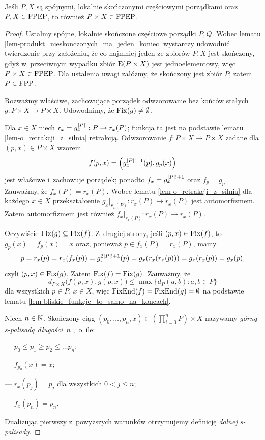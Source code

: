 \begin{stw}\label{stw-produkt_fpep_ma_fpep}
Jeśli $P,X$ są spójnymi, lokalnie skończonymi częściowymi porządkami oraz $P,X\in\mathrm{FPEP}$, to również $P\times X\in\mathrm{FPEP}$.
\end{stw}
\begin{proof}
Ustalmy spójne, lokalnie skończone częściowe porządki $P,Q$.
Wobec lematu \ref{lem-produkt_nieskonczonych_ma_jeden_koniec} wystarczy udowodnić twierdzenie przy założeniu, że co najmniej jeden ze zbiorów $P,X$ jest skończony, gdyż w~przeciwnym wypadku zbiór $\mathrm{E}(P\times X)$ jest jednoelementowy, więc $P\times X\in \mathrm{FPEP}$. Dla ustalenia uwagi załóżmy, że skończony jest zbiór $P$; zatem $P\in\mathrm{FPP}$.

Rozważmy właściwe, zachowujące porządek odwzorowanie bez końców stałych \mbox{$g\colon P\times X\to P\times X$}. Udowodnimy, że $\operatorname{Fix}(g)\not=\emptyset$. 

Dla $x\in X$ niech $r_x=g_x^{\left|P\right|!}\colon P\to r_x(P)$; funkcja ta jest na podstawie lematu \ref{lem-o_retrakcji_z_silnia} retrakcją. Odwzorowanie $f\colon P\times X\to P\times X$ zadane dla $(p,x)\in P\times X$ wzorem \[f(p,x)=\left(g_x^{\left|P\right|!+1}(p),g_p(x)\right)\] jest właściwe i~zachowuje porządek; ponadto $f_x=g_x^{\left|P\right|!+1}$ oraz $f_p=g_p$. Zauważmy, że $f_x(P)=r_x(P)$. Wobec lematu \ref{lem-o_retrakcji_z_silnia} dla każdego $x\in X$ przekształcenie $g_x\big|_{r_x(P)}\colon r_x(P)\to r_x(P)$ jest automorfizmem. Zatem automorfizmem jest również $f_x\big|_{r_x(P)}\colon r_x(P)\to r_x(P)$.

Oczywiście $\operatorname{Fix}(g)\subseteq\operatorname{Fix}(f)$. Z~drugiej strony, jeśli $(p,x)\in \operatorname{Fix}(f)$, to $g_p(x)=f_p(x)=x$ oraz, ponieważ $p\in f_x(P)=r_x(P)$, mamy
\[p=r_x(p)=r_x(f_x(p))=g_x^{2\left|P\right|!+1}(p)=g_x(r_x(r_x(p)))=g_x(r_x(p))=g_x(p),\] czyli $(p,x)\in\operatorname{Fix}(g)$. Zatem $\operatorname{Fix}(f)=\operatorname{Fix}(g)$. Zauważmy, że \[d_{P\times X}\big(f(p,x),g(p,x)\big)\leq \max\{d_P(a,b):a,b\in P\}\] dla wszystkich $p\in P$, $x\in X$, więc $\operatorname{FixEnd}(f)=\operatorname{FixEnd}(g)=\emptyset$ na podstawie lematu \ref{lem-bliskie_funkcje_to_samo_na_koncach}. 
 
Niech $n\in\mathbb{N}$. Skończony ciąg $(p_0,\ldots,p_n,x)\in \left(\prod_{i=0}^{n}P\right)\times X$ nazywamy \textit{górną \mbox{s-palisadą} długości~$n$} \cite{Roddy94},~o~ile: 
\begin{compactitem}
\item[---]$p_0\leq p_1\geq p_2\leq \ldots p_n$;
\item[---]$f_{p_0}(x)=x$;
\item[---]$r_x(p_j)=p_j$ dla wszystkich $0<j\leq n$;
\item[---]$f_x(p_n)=p_n$. 
\end{compactitem}
Dualizując pierwszy z~powyższych warunków otrzymujemy definicję \textit{dolnej \mbox{s-palisady}}.


\end{proof}
